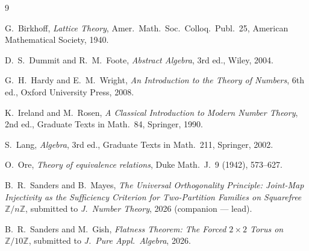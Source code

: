 \documentclass[11pt,reqno]{amsart}
\theoremstyle{plain}
\theoremstyle{definition}
\newcommand{\Z}{\mathbb{Z}}
\begin{document}
\begin{thebibliography}{9}

G.~Birkhoff,
\emph{Lattice Theory},
Amer.\ Math.\ Soc.\ Colloq.\ Publ.\ 25,
American Mathematical Society, 1940.

D.~S.~Dummit and R.~M.~Foote,
\emph{Abstract Algebra}, 3rd ed.,
Wiley, 2004.

G.~H.~Hardy and E.~M.~Wright,
\emph{An Introduction to the Theory of Numbers}, 6th ed.,
Oxford University Press, 2008.

K.~Ireland and M.~Rosen,
\emph{A Classical Introduction to Modern Number Theory}, 2nd ed.,
Graduate Texts in Math.\ 84, Springer, 1990.

S.~Lang,
\emph{Algebra}, 3rd ed.,
Graduate Texts in Math.\ 211, Springer, 2002.

O.~Ore,
\emph{Theory of equivalence relations},
Duke Math.\ J.\ 9 (1942), 573--627.

B.~R.~Sanders and B.~Mayes,
\emph{The Universal Orthogonality Principle: Joint-Map Injectivity as the Sufficiency Criterion for Two-Partition Families on Squarefree $\Z/n\Z$},
submitted to \emph{J.\ Number Theory}, 2026 (companion --- lead).

B.~R.~Sanders and M.~Gish,
\emph{Flatness Theorem: The Forced $2 \times 2$ Torus on $\Z/10\Z$},
submitted to \emph{J.\ Pure Appl.\ Algebra}, 2026.

\end{thebibliography}
\end{document}
